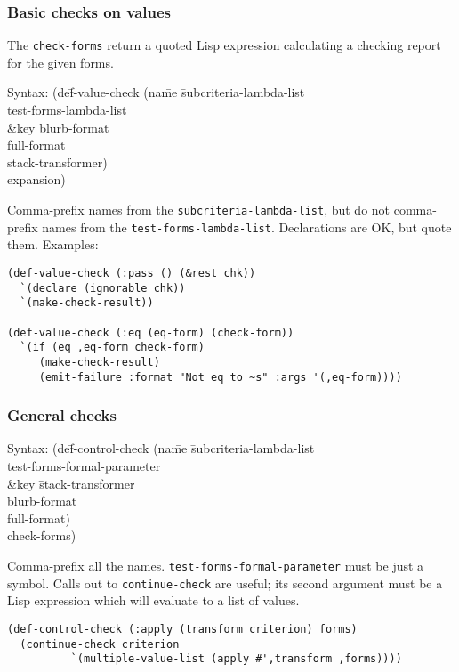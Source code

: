\documentclass{article}
\begin{document}
\subsubsection{Basic checks on values}
The \texttt{check-forms} return a quoted Lisp expression calculating a
checking report for the given forms.  
{\ttfamily\begin{tabbing}
\textrm{Syntax: 
}(de\=f-value-check (na\=me \=subcriteria-lambda-list
\\ \> \> \> test-forms-lambda-list
\\ \> \> \&key \= blurb-format
\\ \> \>        \> full-format
\\ \> \>        \> stack-transformer)
\\ \> expansion)
\end{tabbing}}
Comma-prefix names from the \texttt{subcriteria-lambda-list}, but do not
comma-prefix names from the \texttt{test-forms-lambda-list}.
Declarations are OK, but quote them.  Examples:
\begin{verbatim}
(def-value-check (:pass () (&rest chk))
  `(declare (ignorable chk))
  `(make-check-result))

(def-value-check (:eq (eq-form) (check-form))
  `(if (eq ,eq-form check-form)
     (make-check-result)
     (emit-failure :format "Not eq to ~s" :args '(,eq-form))))
\end{verbatim}
\par{}

\subsubsection{General checks}
{\ttfamily\begin{tabbing}
\textrm{Syntax: 
}(de\=f-control-check (na\=me \=subcriteria-lambda-list
\\ \>\> \> test-forms-formal-parameter
\\ \>\> \&key \=stack-transformer
\\ \>\> \> blurb-format
\\ \>\> \> full-format)
\\ \> check-forms)
\end{tabbing}}
Comma-prefix all the names.  \texttt{test-forms-formal-parameter} must
be just a symbol.  Calls out to \texttt{continue-check} are useful;
its second argument must be a Lisp expression which will evaluate to a
list of values.
\begin{verbatim}
(def-control-check (:apply (transform criterion) forms)
  (continue-check criterion
		  `(multiple-value-list (apply #',transform ,forms))))
\end{verbatim}
\par{}
\end{document}
